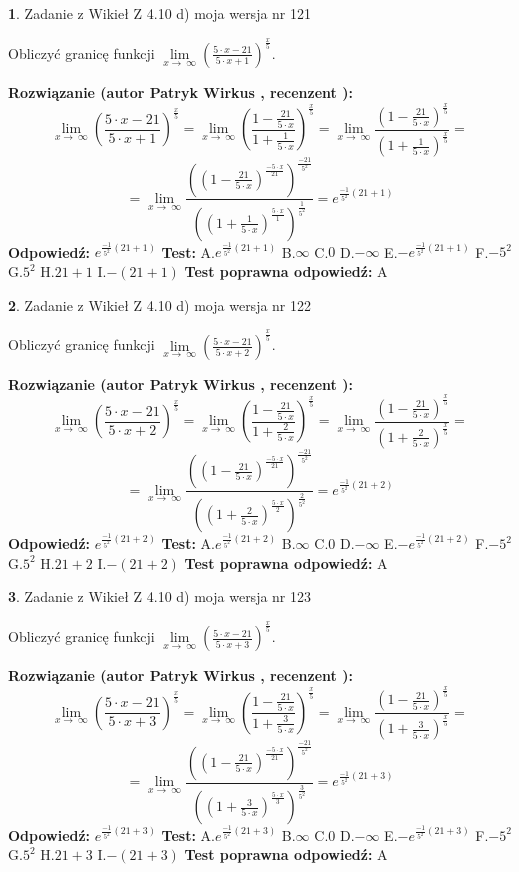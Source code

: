 \documentclass[12pt, a4paper]{article}
\theoremstyle{definition} %
\newtheorem{zad}{}
\newcommand{\zadStart}[1]{\begin{zad}#1\newline}
\newcommand{\zadStop}{\end{zad}}
\newcommand{\rozwStart}[2]{\noindent \textbf{Rozwiązanie (autor #1 , recenzent #2): }\newline}
\newcommand{\rozwStop}{\newline}
\newcommand{\odpStart}{\noindent \textbf{Odpowiedź:}\newline}
\newcommand{\odpStop}{\newline}
\newcommand{\testStart}{\noindent \textbf{Test:}\newline}
\newcommand{\testStop}{\newline}
\newcommand{\kluczStart}{\noindent \textbf{Test poprawna odpowiedź:}\newline}
\newcommand{\kluczStop}{\newline}
\begin{document}
\zadStart{Zadanie z Wikieł Z 4.10 d) moja wersja nr 121}


Obliczyć granicę funkcji  $\lim\limits_{x\to\ \infty}(\frac{5\cdot x-21}{5\cdot x+1})^{\frac{x}{5}}$.
\zadStop
\rozwStart{Patryk Wirkus}{}
$$\lim\limits_{x\to\ \infty}(\frac{5\cdot x-21}{5\cdot x+1})^{\frac{x}{5}} = \lim\limits_{x\to\ \infty}(\frac{1-\frac{21}{5\cdot x}}{1+\frac{1}{5\cdot x}})^{\frac{x}{5}}=\lim\limits_{x\to\ \infty}\frac{(1-\frac{21}{5\cdot x})^{\frac{x}{5}}}{(1+\frac{1}{5\cdot x})^{\frac{x}{5}}}=$$
$$=\lim\limits_{x\to\ \infty}\frac{((1-\frac{21}{5\cdot x})^{\frac{-5\cdot x}{21}})^{\frac{-21}{5^{2}}}}{((1+\frac{1}{5\cdot x})^{\frac{5\cdot x}{1}})^{\frac{1}{5^{2}}}}=e^{\frac{-1}{5^{2}}(21+1)}$$
\rozwStop
\odpStart
$e^{\frac{-1}{5^{2}}(21+1)}$
\odpStop
\testStart
A.$e^{\frac{-1}{5^{2}}(21+1)}$ B.$\infty$ C.$0$ D.$-\infty$ E.$-e^{\frac{-1}{5^{2}}(21+1)}$
F.$-5^{2}$ G.$5^{2}$
H.$21+1$
I.$-(21+1)$
\testStop
\kluczStart
A
\kluczStop



\zadStart{Zadanie z Wikieł Z 4.10 d) moja wersja nr 122}


Obliczyć granicę funkcji  $\lim\limits_{x\to\ \infty}(\frac{5\cdot x-21}{5\cdot x+2})^{\frac{x}{5}}$.
\zadStop
\rozwStart{Patryk Wirkus}{}
$$\lim\limits_{x\to\ \infty}(\frac{5\cdot x-21}{5\cdot x+2})^{\frac{x}{5}} = \lim\limits_{x\to\ \infty}(\frac{1-\frac{21}{5\cdot x}}{1+\frac{2}{5\cdot x}})^{\frac{x}{5}}=\lim\limits_{x\to\ \infty}\frac{(1-\frac{21}{5\cdot x})^{\frac{x}{5}}}{(1+\frac{2}{5\cdot x})^{\frac{x}{5}}}=$$
$$=\lim\limits_{x\to\ \infty}\frac{((1-\frac{21}{5\cdot x})^{\frac{-5\cdot x}{21}})^{\frac{-21}{5^{2}}}}{((1+\frac{2}{5\cdot x})^{\frac{5\cdot x}{2}})^{\frac{2}{5^{2}}}}=e^{\frac{-1}{5^{2}}(21+2)}$$
\rozwStop
\odpStart
$e^{\frac{-1}{5^{2}}(21+2)}$
\odpStop
\testStart
A.$e^{\frac{-1}{5^{2}}(21+2)}$ B.$\infty$ C.$0$ D.$-\infty$ E.$-e^{\frac{-1}{5^{2}}(21+2)}$
F.$-5^{2}$ G.$5^{2}$
H.$21+2$
I.$-(21+2)$
\testStop
\kluczStart
A
\kluczStop



\zadStart{Zadanie z Wikieł Z 4.10 d) moja wersja nr 123}


Obliczyć granicę funkcji  $\lim\limits_{x\to\ \infty}(\frac{5\cdot x-21}{5\cdot x+3})^{\frac{x}{5}}$.
\zadStop
\rozwStart{Patryk Wirkus}{}
$$\lim\limits_{x\to\ \infty}(\frac{5\cdot x-21}{5\cdot x+3})^{\frac{x}{5}} = \lim\limits_{x\to\ \infty}(\frac{1-\frac{21}{5\cdot x}}{1+\frac{3}{5\cdot x}})^{\frac{x}{5}}=\lim\limits_{x\to\ \infty}\frac{(1-\frac{21}{5\cdot x})^{\frac{x}{5}}}{(1+\frac{3}{5\cdot x})^{\frac{x}{5}}}=$$
$$=\lim\limits_{x\to\ \infty}\frac{((1-\frac{21}{5\cdot x})^{\frac{-5\cdot x}{21}})^{\frac{-21}{5^{2}}}}{((1+\frac{3}{5\cdot x})^{\frac{5\cdot x}{3}})^{\frac{3}{5^{2}}}}=e^{\frac{-1}{5^{2}}(21+3)}$$
\rozwStop
\odpStart
$e^{\frac{-1}{5^{2}}(21+3)}$
\odpStop
\testStart
A.$e^{\frac{-1}{5^{2}}(21+3)}$ B.$\infty$ C.$0$ D.$-\infty$ E.$-e^{\frac{-1}{5^{2}}(21+3)}$
F.$-5^{2}$ G.$5^{2}$
H.$21+3$
I.$-(21+3)$
\testStop
\kluczStart
A
\kluczStop
\end{document}
